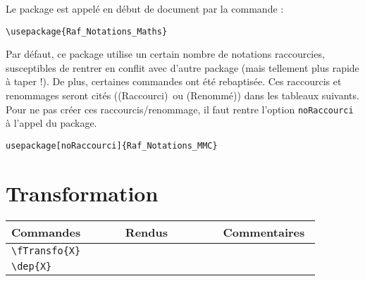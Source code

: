 \documentclass[a4paper,10pt]{article}
\newcommand{\rac}{({\color{red}Raccourci})}
\newcommand{\ren}{({\color{blue}Renommé})}
\begin{document}
	Le package est appelé en début de document par la commande :
	\begin{verbatim}
\usepackage{Raf_Notations_Maths}
	\end{verbatim}

	Par défaut, ce package utilise un certain nombre de notations raccourcies, susceptibles de rentrer en conflit avec d'autre package (mais tellement plus rapide à taper !).
	De plus, certaines commandes ont été rebaptisée.
	Ces raccourcis et renommages seront cités (\rac\ ou \ren) dans les tableaux suivants.
	Pour ne pas créer ces raccourcis/renommage, il faut rentre l'option \verb!noRaccourci! à l'appel du package.

	\begin{verbatim}
usepackage[noRaccourci]{Raf_Notations_MMC}
	\end{verbatim}
	
	
	
	\section{Transformation}
    \noindent
	\begin{tabular}{|p{0.35\linewidth}|p{0.3\linewidth}|p{0.3\linewidth}|}
		\hline
			\textbf{Commandes}&\textbf{Rendus}&\textbf{Commentaires}
		\\\hline\hline
			\verb!\fTransfo{X}!			&	\fTransfo{X}			&	
		\\\hline
			\verb!\dep{X}!			&	\dep{X}			&	
		\\\hline
	\end{tabular}
	
\end{document}
